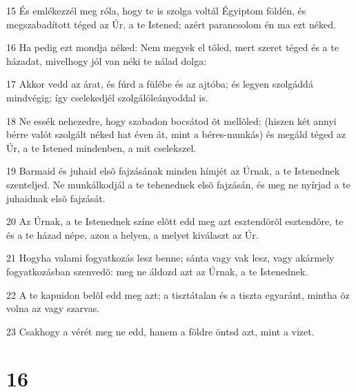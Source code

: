\par 15 És emlékezzél meg róla, hogy te is szolga voltál Égyiptom földén, és megszabadított téged az Úr, a te Istened; azért parancsolom én ma ezt néked.
\par 16 Ha pedig ezt mondja néked: Nem megyek el tõled, mert szeret téged és a te házadat, mivelhogy jól van néki te nálad dolga:
\par 17 Akkor vedd az árat, és fúrd a fülébe és az ajtóba; és legyen szolgáddá mindvégig; így cselekedjél szolgálóleányoddal is.
\par 18 Ne essék nehezedre, hogy szabadon bocsátod õt mellõled; (hiszen két annyi bérre valót szolgált néked hat éven át, mint a béres-munkás) és megáld téged az Úr, a te Istened mindenben, a mit cselekszel.
\par 19 Barmaid és juhaid elsõ fajzásának minden hímjét az Úrnak, a te Istenednek szenteljed. Ne munkálkodjál a te tehenednek elsõ fajzásán, és meg ne nyírjad a te juhaidnak elsõ fajzását.
\par 20 Az Úrnak, a te Istenednek színe elõtt edd meg azt esztendõrõl esztendõre, te és a te házad népe, azon a helyen, a melyet kiválaszt az Úr.
\par 21 Hogyha valami fogyatkozás lesz benne; sánta vagy vak lesz, vagy akármely fogyatkozásban szenvedõ: meg ne áldozd azt az Úrnak, a te Istenednek.
\par 22 A te kapuidon belõl edd meg azt; a tisztátalan és a tiszta egyaránt, mintha õz volna az vagy szarvas.
\par 23 Csakhogy a vérét meg ne edd, hanem a földre öntsd azt, mint a vizet.

\chapter{16}

